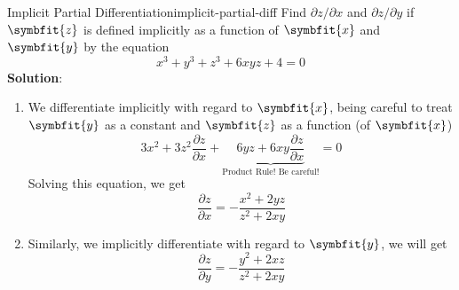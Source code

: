 \documentclass[math,code]{amznotes}
\theoremstyle{remark}
\begin{document}
\begin{exbox}{Implicit Partial Differentiation}{implicit-partial-diff}
    Find $\partial z / \partial x$ and $\partial z / \partial y$ if $\symbfit{z}$ is defined implicitly as a function of $\symbfit{x}$ and $\symbfit{y}$ by the equation
    \begin{displaymath}
        x^3+y^3+z^3+6xyz+4=0
    \end{displaymath}
    {\color{blue} \textbf{Solution}}:
    \begin{enumerate}
        \item We differentiate implicitly with regard to $\symbfit{x}$, being careful to treat $\symbfit{y}$ as a constant and $\symbfit{z}$ as a function (of $\symbfit{x}$)
        \begin{displaymath}
            3x^2+3z^2\frac{\partial z}{\partial x}+\underbrace{6yz+6xy\frac{\partial z}{\partial x}}_\text{Product Rule! Be careful!}=0
        \end{displaymath}
        Solving this equation, we get
        \begin{displaymath}
            \frac{\partial z}{\partial x}=-\frac{x^2+2yz}{z^2+2xy}
        \end{displaymath}
        \item Similarly, we implicitly differentiate with regard to $\symbfit{y}$, we will get
        \begin{displaymath}
            \frac{\partial z}{\partial y}=-\frac{y^2+2xz}{z^2+2xy}
        \end{displaymath}
    \end{enumerate}
\end{exbox}
\end{document}
